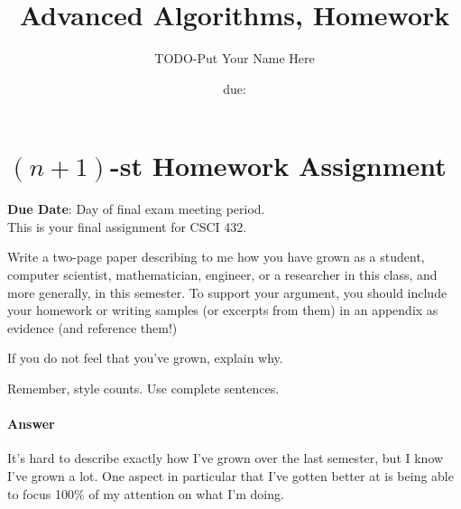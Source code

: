 \documentclass{article}
\title{Advanced Algorithms, Homework \hwnum}
\author{TODO-Put Your Name Here}
\date{due: \todo{}}
\begin{document}
\section*{$(n+1)$-st Homework Assignment}

{\bf{Due Date}}: Day of final exam meeting period.\\

This is your final assignment for CSCI 432.

Write a two-page paper describing to me how you have grown as a student,
computer scientist, mathematician, engineer, or a researcher in this class, and
more generally, in this semester.  To support your argument, you should include
your homework or writing samples (or excerpts from them) in an appendix as
evidence (and reference them!)

If you do not feel that you've grown, explain why.

Remember, style counts. Use complete sentences.

\paragraph{Answer}

It's hard to describe exactly how I've grown over the last semester, but I know I've grown a lot. One aspect in particular that I've gotten better at is being able to focus 100\% of my attention on what I'm doing.
\end{document}
